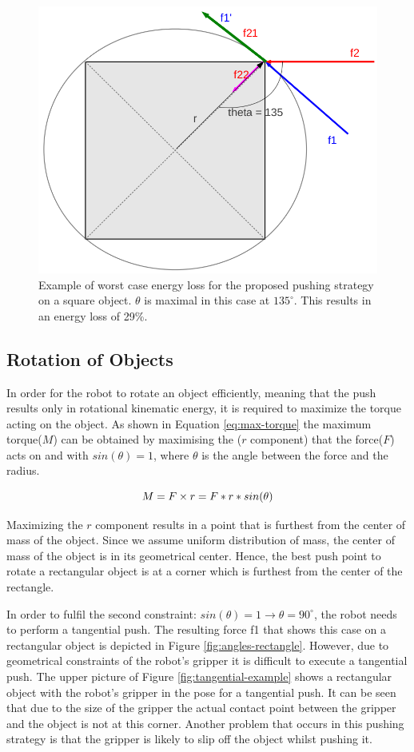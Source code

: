 \begin{figure}
\centering
 

\includegraphics[width=0.5\columnwidth]{figures/square-angle.png}


\caption[Example of worst case energy loss for the proposed pushing strategy on a square object.]{Example of worst case energy loss for the proposed pushing strategy on a square object. $\theta$ is maximal in this case at $135 ^\circ$. This results in an energy loss of 29\%.  }
\label{fig:angles-square}
\end{figure}

\subsection{Rotation of Objects}
In order for the robot to rotate an object efficiently, meaning that the push results only in rotational kinematic energy, it is required to maximize the torque acting on the object. As shown in Equation \ref{eq:max-torque} the maximum torque($M$) can be obtained by maximising the ($r$ component) that the force($F$) acts on and with $sin(\theta) = 1$, where $\theta$ is the angle between the force and the radius.

\begin{equation}
M =  F \times r = F*r*sin(\theta)\\
\label{eq:max-torque}
\end{equation}

Maximizing the $r$ component results in a point that is furthest from the center of mass of the object. Since we assume uniform distribution of mass, the center of mass of the object is in its geometrical center. Hence, the best push point to rotate a rectangular object is at a corner which is furthest from the center of the rectangle.

In order to fulfil the second constraint: $sin(\theta) = 1 \to \theta = 90 ^\circ$, the robot needs to perform a tangential push. The resulting force f1 that shows this case on a rectangular object is depicted in Figure \ref{fig:angles-rectangle}. However, due to geometrical constraints of the robot's gripper it is difficult to execute a tangential push. The upper picture of Figure \ref{fig:tangential-example} shows a rectangular object with the robot's gripper in the pose for a tangential push. It can be seen that due to the size of the gripper the actual contact point between the gripper and the object is not at this corner. Another problem that occurs in this pushing strategy is that the gripper is likely to slip off the object whilst pushing it.

